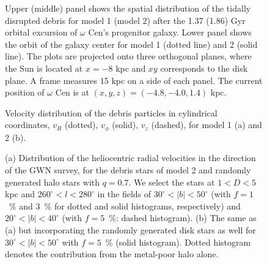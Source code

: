 \documentclass[preprint,12pt]{aastex}
\begin{document}

\clearpage
\begin{figure}
\caption{
Upper (middle) panel shows the spatial distribution of the tidally disrupted
debris for model 1 (model 2) after the 1.37 (1.86) Gyr orbital excursion of
$\omega$ Cen's progenitor galaxy. Lower panel shows the orbit of the galaxy
center for model 1 (dotted line) and 2 (solid line). The plots are projected
onto three orthogonal planes, where the Sun is located at $x=-8$ kpc and $xy$
corresponds to the disk plane. A frame measures 15 kpc on a side of each panel.
The current position of $\omega$ Cen is at $(x,y,z)= (-4.8,-4.0,1.4)$ kpc.
}
\end{figure}

\begin{figure}
\caption{
Velocity distribution of the debris particles in cylindrical coordinates,
$v_R$ (dotted), $v_\phi$ (solid), $v_z$ (dashed), for
model 1 (a) and 2 (b).
}
\end{figure}

\begin{figure}
\caption{
(a) Distribution of the heliocentric radial velocities in the direction of
the GWN survey, for the debris stars of model 2
and randomly generated halo stars with $q=0.7$.
We select the stars at $1<D<5$ kpc and $260^\circ<l<280^\circ$
in the fields of $30^\circ<|b|<50^\circ$ (with $f=1$~\% and 3~\% for
dotted and solid histograms, respectively) and $20^\circ<|b|<40^\circ$
(with $f=5$~\%: dashed histogram).
(b) The same as (a) but incorporating the randomly generated disk
stars as well for $30^\circ<|b|<50^\circ$ with $f=5$~\% (solid histogram).
Dotted histogram denotes the contribution from the metal-poor halo alone.
}
\end{figure}
\end{document}
